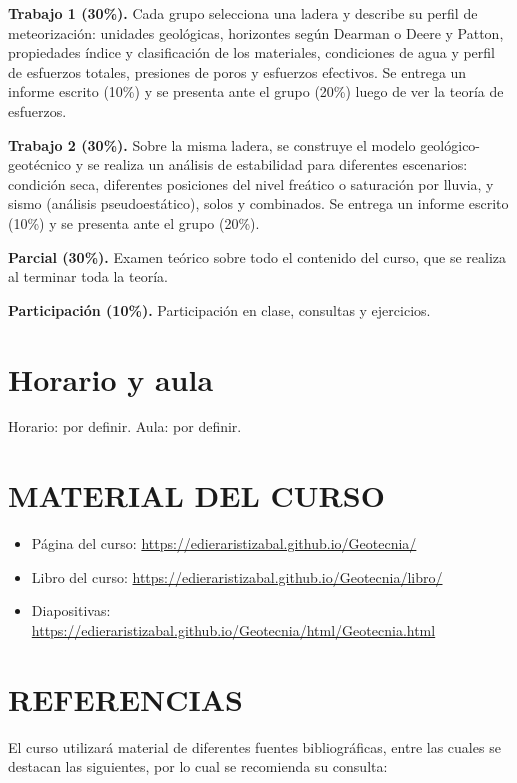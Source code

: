 \documentclass[a4paper,twoside,11pt]{article}
\begin{document}
\textbf{Trabajo 1 (30\%).} Cada grupo selecciona una ladera y describe su perfil de meteorización: unidades
geológicas, horizontes según Dearman o Deere y Patton, propiedades índice y clasificación de los materiales,
condiciones de agua y perfil de esfuerzos totales, presiones de poros y esfuerzos efectivos. Se entrega un
informe escrito (10\%) y se presenta ante el grupo (20\%) luego de ver la teoría de esfuerzos.

\textbf{Trabajo 2 (30\%).} Sobre la misma ladera, se construye el modelo geológico-geotécnico y se realiza un
análisis de estabilidad para diferentes escenarios: condición seca, diferentes posiciones del nivel freático
o saturación por lluvia, y sismo (análisis pseudoestático), solos y combinados. Se entrega un informe escrito
(10\%) y se presenta ante el grupo (20\%).

\textbf{Parcial (30\%).} Examen teórico sobre todo el contenido del curso, que se realiza al terminar toda
la teoría.

\textbf{Participación (10\%).} Participación en clase, consultas y ejercicios.

\section*{Horario y aula}
Horario: por definir. \quad Aula: por definir.

\section{MATERIAL DEL CURSO}
\begin{itemize}
\item Página del curso: \url{https://edieraristizabal.github.io/Geotecnia/}
\item Libro del curso: \url{https://edieraristizabal.github.io/Geotecnia/libro/}
\item Diapositivas: \url{https://edieraristizabal.github.io/Geotecnia/html/Geotecnia.html}
\end{itemize}

\section{REFERENCIAS}
El curso utilizará material de diferentes fuentes bibliográficas, entre las cuales se destacan las
siguientes, por lo cual se recomienda su consulta:
\end{document}
